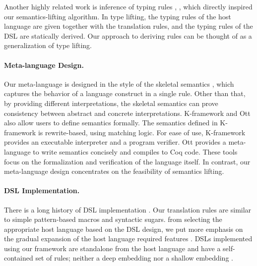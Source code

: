 Another highly related work is inference of typing rules \cite{infer-types}, , which directly inspired our semantics-lifting algorithm. In type lifting, the typing rules of the host language are given together with the translation rules, and the typing rules of the DSL are statically derived. Our approach to deriving  rules can be thought of as a generalization of type lifting.

\paragraph{Meta-language Design.}
Our meta-language is designed in the style of the skeletal semantics \cite{skeleton},
which captures the behavior of a language construct in a single rule.
Other than that, by providing different interpretations,
 the skeletal semantics can prove consistency between abstract and concrete interpretations.
K-framework \cite{rosu2010overview} and Ott \cite{Ott} also allow users to define semantics formally. 
The semantics defined in K-framework is rewrite-based, using matching logic.
For ease of use, K-framework provides an executable interpreter and a program verifier.
Ott provides a meta-language to write semantics concisely and compiles  to Coq code.
These tools focus on the formalization and verification of the language itself.
In contrast, our meta-language design concentrates on the feasibility of semantics lifting.

\paragraph{DSL Implementation.}
There is a long history of DSL implementation \cite{MartinDSL,when-how-dsl}. Our translation rules are similar to simple pattern-based macros and syntactic sugars. 
 from selecting the appropriate host language based on the DSL design,
 we put more emphasis on the gradual expansion of the host language  required features \cite{MoggiMeta}.
DSLs implemented using our framework are standalone from the host language and have a self-contained set of  rules;  neither a deep embedding nor a shallow embedding \cite{gibbons2014folding}.